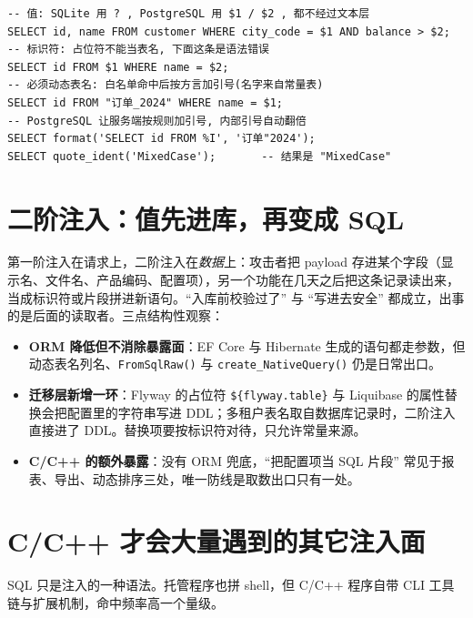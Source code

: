 \documentclass[12pt,a4paper,fontset=fandol]{ctexbook}
\newcommand{\Fn}[1]{\texttt{#1()}}
\newcommand{\CppJava}{C/C++}
\begin{document}
\begin{lstlisting}[style=sqlstyle,caption={值用占位符，标识符用白名单加方言引号}]
-- 值: SQLite 用 ? , PostgreSQL 用 $1 / $2 , 都不经过文本层
SELECT id, name FROM customer WHERE city_code = $1 AND balance > $2;
-- 标识符: 占位符不能当表名, 下面这条是语法错误
SELECT id FROM $1 WHERE name = $2;
-- 必须动态表名: 白名单命中后按方言加引号(名字来自常量表)
SELECT id FROM "订单_2024" WHERE name = $1;
-- PostgreSQL 让服务端按规则加引号, 内部引号自动翻倍
SELECT format('SELECT id FROM %I', '订单"2024');
SELECT quote_ident('MixedCase');       -- 结果是 "MixedCase"
\end{lstlisting}

\section{二阶注入：值先进库，再变成 SQL}

第一阶注入在请求上，二阶注入在\emph{数据}上：攻击者把 payload 存进某个字段（显示名、文件名、产品编码、配置项），另一个功能在几天之后把这条记录读出来，当成标识符或片段拼进新语句。``入库前校验过了'' 与 ``写进去安全'' 都成立，出事的是后面的读取者。三点结构性观察：

\begin{itemize}
  \item \textbf{ORM 降低但不消除暴露面}：EF Core 与 Hibernate 生成的语句都走参数，但动态表名列名、\Fn{FromSqlRaw} 与 \Fn{create\_\allowbreak NativeQuery} 仍是日常出口。
  \item \textbf{迁移层新增一环}：Flyway 的占位符 \texttt{\$\{flyway.table\}} 与 Liquibase 的属性替换会把配置里的字符串写进 DDL；多租户表名取自数据库记录时，二阶注入直接进了 DDL。替换项要按标识符对待，只允许常量来源。
  \item \textbf{\CppJava{} 的额外暴露}：没有 ORM 兜底，``把配置项当 SQL 片段'' 常见于报表、导出、动态排序三处，唯一防线是取数出口只有一处。
\end{itemize}

\section{\CppJava{} 才会大量遇到的其它注入面}

SQL 只是注入的一种语法。托管程序也拼 shell，但 \CppJava{} 程序自带 CLI 工具链与扩展机制，命中频率高一个量级。
\end{document}
